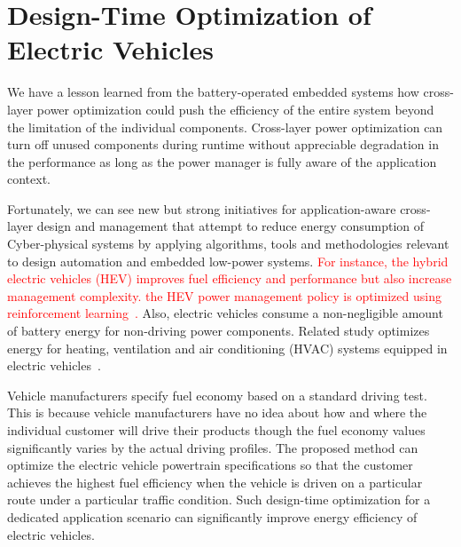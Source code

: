 \documentclass[journal]{IEEEtran}
\begin{document}
\section{Design-Time Optimization of Electric Vehicles}

We have a lesson learned from the battery-operated embedded systems how cross-layer power optimization could push the efficiency of the entire system beyond the limitation of the individual components. Cross-layer power optimization can turn off unused components during runtime without appreciable degradation in the performance as long as the power manager is fully aware of the application context. 

Fortunately, we can see new but strong initiatives for application-aware cross-layer design and management that attempt to reduce energy consumption of Cyber-physical systems by applying algorithms, tools and methodologies relevant to design automation and embedded low-power systems. 
\textcolor{red}{For instance, the hybrid electric vehicles (HEV) improves fuel efficiency and performance but also increase management complexity. the HEV power management policy is optimized using reinforcement learning~\cite{Lin:ICCAD14}.}
Also, electric vehicles consume a non-negligible amount of battery energy for non-driving power components. Related study optimizes energy for heating, ventilation and air conditioning (HVAC) systems equipped in electric vehicles~\cite{Vatanparvar:DAC15}.



Vehicle manufacturers specify fuel economy based on a standard driving test. This is because vehicle manufacturers have no idea about how and where the individual customer will drive their products though the fuel economy values significantly varies by the actual driving profiles. 
The proposed method can optimize the electric vehicle powertrain specifications so that the customer achieves the highest fuel efficiency when the vehicle is driven on a particular route under a particular traffic condition. 
Such design-time optimization for a dedicated application scenario can significantly improve energy efficiency of electric vehicles.
\end{document}
